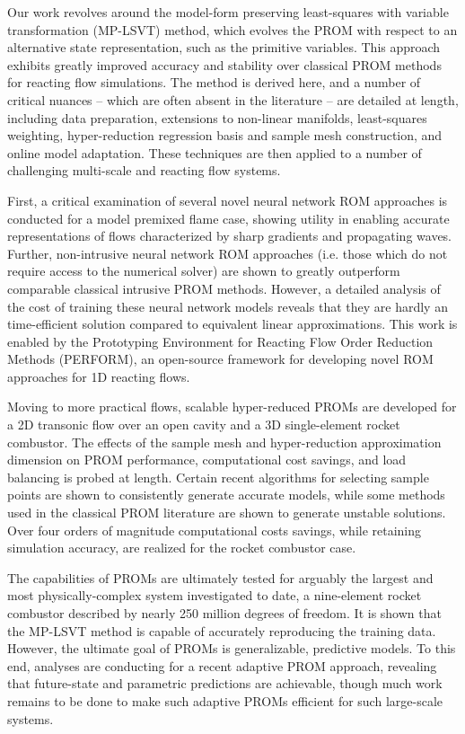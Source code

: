 Our work revolves around the  model-form preserving least-squares with variable transformation (MP-LSVT) method, which evolves the PROM with respect to an alternative state representation, such as the primitive variables. This approach exhibits greatly improved accuracy and stability over classical PROM methods for reacting flow simulations. The method is derived here, and a number of critical nuances -- which are often absent in the literature -- are detailed at length, including data preparation, extensions to non-linear manifolds, least-squares weighting, hyper-reduction regression basis and sample mesh construction, and online model adaptation. These techniques are then applied to a number of challenging multi-scale and reacting flow systems.

First, a critical examination of several novel neural network ROM approaches is conducted for a model premixed flame case, showing  utility in enabling  accurate representations of flows characterized by sharp gradients and propagating waves. Further, non-intrusive neural network ROM approaches (i.e. those which do not require access to the numerical solver) are shown to greatly outperform comparable classical intrusive PROM methods. However, a detailed analysis of the cost of training these neural network models reveals that they are hardly an time-efficient solution compared to equivalent linear approximations. This work is enabled by the Prototyping Environment for Reacting Flow Order Reduction Methods (PERFORM), an open-source framework for developing novel ROM approaches for 1D reacting flows.

Moving to more practical flows, scalable hyper-reduced PROMs are developed for a 2D transonic flow over an open cavity and a 3D single-element rocket combustor. The effects of the sample mesh and hyper-reduction approximation dimension on PROM performance, computational cost savings, and load balancing is probed at length. Certain recent algorithms for selecting sample points are shown to consistently generate accurate models, while some methods used in the classical PROM literature are shown to generate unstable solutions. Over four orders of magnitude computational costs savings, while retaining simulation accuracy, are realized for the rocket combustor case.

The capabilities of PROMs are ultimately tested for arguably the largest and most physically-complex system investigated to date, a nine-element rocket combustor described by nearly 250 million degrees of freedom. It is shown that the MP-LSVT method is capable of accurately reproducing the training data. However, the ultimate goal of PROMs is generalizable, predictive models. To this end, analyses are conducting for a recent adaptive PROM approach, revealing that future-state and parametric predictions are achievable, though much work remains to be done to make such adaptive PROMs efficient for such large-scale systems.

